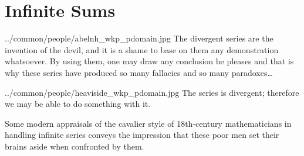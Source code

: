 ﻿%
\chapter{Infinite Sums}
  {../common/people/abelnh_wkp_pdomain.jpg}
  {The divergent series are the invention of the devil, and it is a shame to base on them any demonstration whatsoever.
   By using them, one may draw any conclusion he pleases and that is why these series have produced so many 
   fallacies and so many paradoxes\ldots}

{../common/people/heaviside_wkp_pdomain.jpg}
{The series is divergent; therefore we may be able to do something with it.}

{Some modern appraisals of the cavalier style of 18th-century mathematicians in handling 
infinite series conveys the impression that these poor men set their brains aside when 
confronted by them.}

